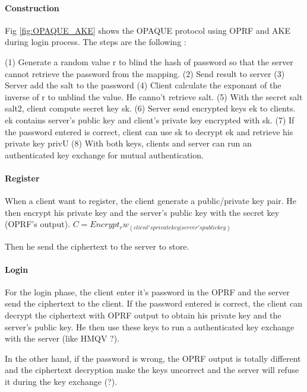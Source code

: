 \documentclass[../report.tex]{subfiles}
\begin{document}
\paragraph{Construction}

Fig \ref{fig:OPAQUE_AKE} shows the OPAQUE protocol using OPRF and AKE during login process.
The steps are the following :

(1) Generate a random value r to blind the hash of password so that the server cannot retrieve the password from the mapping.
(2) Send result to server
(3) Server add the salt to the password
(4) Client calculate the exponant of the inverse of r to unblind the value. He canno't retrieve salt.
(5) With the secret salt salt2, client compute secret key sk.
(6) Server send encrypted keys ek to clients. ek contains server's public key and client's private key encrypted with sk.
(7) If the password entered is correct, client can use sk to decrypt ek and retrieve his private key privU
(8) With both keys, clients and server can run an authenticated key exchange for mutual authentication.


\paragraph{Register}
When a client want to register, the client generate a public/private key pair. He then encrypt his private key and the server's public key with the secret key (OPRF's output).
$C = Encrypt_rw_(client's private key | server's public key)$

Then he send the ciphertext to the server to store.


\paragraph{Login}
For the login phase, the client enter it's password in the OPRF and the server send the ciphertext to the client.
If the password entered is correct, the client can decrypt the ciphertext with OPRF output to obtain his private key and the server's public key.
He then use these keys to run a authenticated key exchange with the server (like HMQV ?).

In the other hand, if the password is wrong, the OPRF output is totally different and the ciphertext decryption make the keys uncorrect and the server will refuse it during the key exchange (?). %



\end{document}
